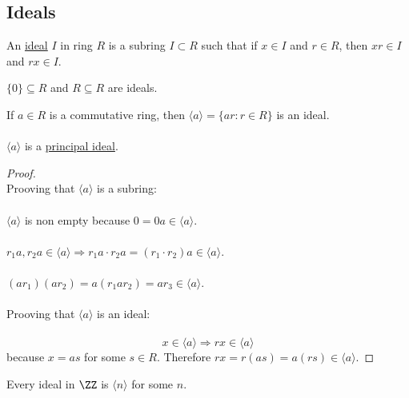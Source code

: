 \documentclass[class=scrartcl, crop=false]{standalone}
\begin{document}
\subsection{Ideals}
\begin{definition}
  An \ul{ideal} $I$ in ring $R$ is a subring $I \subset R$ such that if $x \in I$ and $r \in R$, then $xr \in I$ and $rx \in I$.
  \begin{example}
    $\{0\} \subseteq R$ and $R \subseteq R$ are ideals.
  \end{example} 
  \begin{example}
    If $a \in R$ is a commutative ring, then $\langle a \rangle = \{ar : r \in R\}$ is an ideal.
    \\\\
    $\langle a \rangle $ is a \ul{principal ideal}.
    \begin{proof} \leavevmode \\
      Prooving that $\langle a \rangle $ is a subring:
      \\\\
      $\langle a \rangle $ is non empty because $0 = 0a \in \langle a \rangle $.
      \\\\
      $r_1a, r_2a \in \langle a \rangle \Rightarrow r_1a \cdot r_2a = (r_1\cdot r_2)a \in \langle a \rangle $.
      \\\\
      $(ar_1)(ar_2) = a(r_1ar_2) = ar_3 \in \langle a \rangle $.
      \\\\
      Prooving that $\langle a \rangle $ is an ideal:
      \\\\
      \[
        x \in \langle a \rangle \Rightarrow rx \in \langle a \rangle 
      \] because $x = as$ for some $s \in R$. Therefore $rx = r(as) = a(rs) \in \langle a \rangle $.
    \end{proof} 
  \end{example} 
\end{definition} 
\begin{theorem}
  Every ideal in $\ZZ$ is $\langle n \rangle $ for some $n$.
\end{theorem} 
\end{document}
